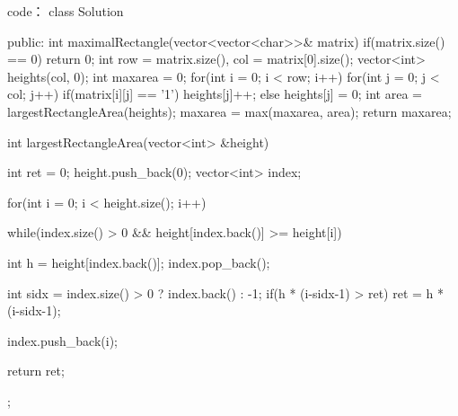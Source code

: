 code：
class Solution {
public:
    int maximalRectangle(vector<vector<char>>& matrix) {
        if(matrix.size() == 0) return 0;
        int row = matrix.size(), col = matrix[0].size();
        vector<int> heights(col, 0);
        int maxarea = 0;
        for(int i = 0; i < row; i++)
        {
            for(int j = 0; j < col; j++)
            {
                if(matrix[i][j] == '1') heights[j]++;
                else heights[j] = 0;
            }
            int area = largestRectangleArea(heights);
            maxarea = max(maxarea, area);
        }
        return maxarea;
    }
    
    int largestRectangleArea(vector<int> &height) {
            
            int ret = 0;
            height.push_back(0);
            vector<int> index;
            
            for(int i = 0; i < height.size(); i++)
            {
                while(index.size() > 0 && height[index.back()] >= height[i])
                {
                    int h = height[index.back()];
                    index.pop_back();
                    
                    int sidx = index.size() > 0 ? index.back() : -1;
                    if(h * (i-sidx-1) > ret)
                        ret = h * (i-sidx-1);
                }
                index.push_back(i);
            }
            
            return ret;
        }
};